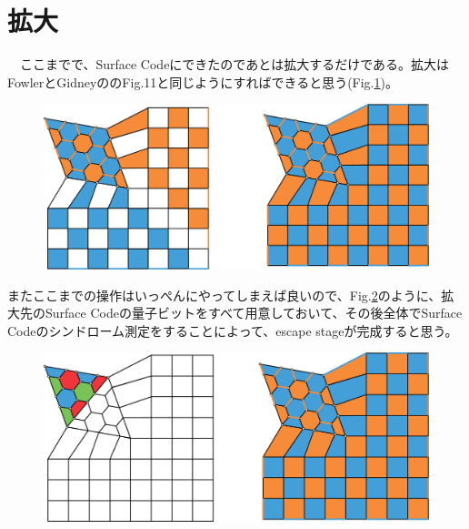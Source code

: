 \documentclass[a4paper,9pt]{ltjsarticle}
\begin{document}
\section{拡大}{
    　ここまでで、Surface Codeにできたのであとは拡大するだけである。拡大はFowlerとGidneyの\cite{fowler2019}のFig.11と同じようにすればできると思う(Fig.\ref{figure5})。

    \begin{figure}[h]
        \centering
        \includegraphics[scale=0.20]{figure/figure5.eps}
        \vspace{10pt}\caption{}
        \label{figure5}
        \vspace{-15pt}
    \end{figure}
    \clearpage
    またここまでの操作はいっぺんにやってしまえば良いので、Fig.\ref{figure6}のように、拡大先のSurface Codeの量子ビットをすべて用意しておいて、その後全体でSurface Codeのシンドローム測定をすることによって、escape stageが完成すると思う。
    \begin{figure}[h]
        \centering
        \includegraphics[scale=0.20]{figure/figure6.eps}
        \vspace{10pt}\caption{}
        \label{figure6}
        \vspace{-15pt}
    \end{figure}
}
\end{document}
